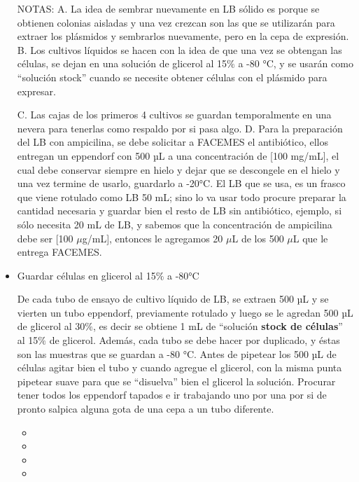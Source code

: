 \begin{appendix}
\begin{itemize}
NOTAS: 
    A. La idea de sembrar nuevamente en LB sólido es porque se obtienen colonias aisladas y una vez crezcan son las que se utilizarán para extraer los plásmidos y sembrarlos nuevamente, pero en la cepa de expresión.
    B. Los cultivos líquidos se hacen con la idea de que una vez se obtengan las células, se dejan en una solución de glicerol al 15$\%$ a -80 °C, y se usarán como “solución stock” cuando se necesite obtener células con el plásmido para expresar.

    C. Las cajas de los primeros 4 cultivos se guardan temporalmente en una nevera para tenerlas como respaldo por si pasa algo. 
    D. Para la preparación del LB con ampicilina, se debe solicitar a FACEMES el antibiótico, ellos entregan un eppendorf con 500 µL a una concentración de [100 mg/mL], el cual debe conservar siempre en hielo y dejar que se descongele en el hielo y una vez termine de usarlo, guardarlo a -20°C. El LB que se usa, es un frasco que viene rotulado como LB 50 mL; sino lo va usar todo procure preparar la cantidad necesaria y guardar bien el resto de LB sin antibiótico, ejemplo, si sólo necesita 20 mL de LB, y sabemos que la concentración de ampicilina debe ser [100 $\mu$g/mL], entonces le agregamos 20 $\mu$L de los 500 $\mu$L que le entrega FACEMES. 


\item{Guardar células en glicerol al 15$\%$ a -80°C}

De cada tubo de ensayo de cultivo líquido de LB, se extraen 500 µL y se vierten un tubo eppendorf, previamente rotulado y luego se le agredan 500 µL de glicerol al 30$\%$, es decir se obtiene 1 mL de “solución \textbf{stock de células}” al 15$\%$ de glicerol. Además, cada tubo se debe hacer por duplicado, y éstas son las muestras que se guardan a -80 °C. 
Antes de pipetear los 500 µL de células agitar bien el tubo y cuando agregue el glicerol, con la misma punta pipetear suave para que se “disuelva” bien el glicerol la solución.
Procurar tener todos los eppendorf tapados e ir trabajando uno por una por si de pronto salpica alguna gota de una cepa a un tubo diferente.

     \begin{itemize}
        \item{}
        \item{}
        \item{}
        \item{}
    \end{itemize}




\end{itemize}
\end{appendix}
